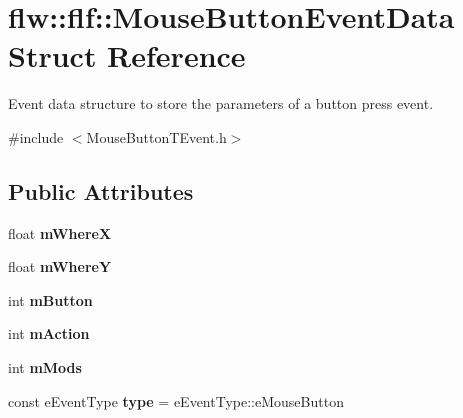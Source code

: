 \hypertarget{structflw_1_1flf_1_1MouseButtonEventData}{}\section{flw\+:\+:flf\+:\+:Mouse\+Button\+Event\+Data Struct Reference}
\label{structflw_1_1flf_1_1MouseButtonEventData}


Event data structure to store the parameters of a button press event.  




{\ttfamily \#include $<$Mouse\+Button\+T\+Event.\+h$>$}

\subsection*{Public Attributes}
\begin{DoxyCompactItemize}
\item 
float {\bfseries m\+WhereX}\hypertarget{structflw_1_1flf_1_1MouseButtonEventData_a7f0e76f3957f424fb816771bd532b55b}{}\label{structflw_1_1flf_1_1MouseButtonEventData_a7f0e76f3957f424fb816771bd532b55b}

\item 
float {\bfseries m\+WhereY}\hypertarget{structflw_1_1flf_1_1MouseButtonEventData_a81efd270caa77b7b45e5e91424a82d97}{}\label{structflw_1_1flf_1_1MouseButtonEventData_a81efd270caa77b7b45e5e91424a82d97}

\item 
int {\bfseries m\+Button}\hypertarget{structflw_1_1flf_1_1MouseButtonEventData_a0a18ff3909e033925eb8cf1e62479930}{}\label{structflw_1_1flf_1_1MouseButtonEventData_a0a18ff3909e033925eb8cf1e62479930}

\item 
int {\bfseries m\+Action}\hypertarget{structflw_1_1flf_1_1MouseButtonEventData_a03847231ba8caa4af97ed1f0104e0ccf}{}\label{structflw_1_1flf_1_1MouseButtonEventData_a03847231ba8caa4af97ed1f0104e0ccf}

\item 
int {\bfseries m\+Mods}\hypertarget{structflw_1_1flf_1_1MouseButtonEventData_a01cea352021993ee0596a065277f4531}{}\label{structflw_1_1flf_1_1MouseButtonEventData_a01cea352021993ee0596a065277f4531}

\item 
const e\+Event\+Type {\bfseries type} = e\+Event\+Type\+::e\+Mouse\+Button\hypertarget{structflw_1_1flf_1_1MouseButtonEventData_a0f3cd98d82201f211da7edca1222058e}{}\label{structflw_1_1flf_1_1MouseButtonEventData_a0f3cd98d82201f211da7edca1222058e}

\end{DoxyCompactItemize}


